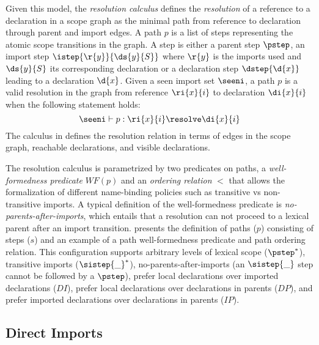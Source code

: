 Given this model, the \emph{resolution calculus} defines the \emph{resolution}
of a reference to a declaration in a scope graph \cite{NeronTVW-ESOP-2015} as
the minimal path from reference to declaration through parent and import edges.
A path $p$ is a list of steps representing the atomic scope transitions in the
graph. A step is either a parent step $\pstep$, an import step
$\istep{\r{y}}{\ds{y}{S}}$ where $\r{y}$ is the imports used and $\ds{y}{S}$ its
corresponding declaration or a declaration step $\dstep{\d{x}}$ leading to a
declaration $\d{x}$.
Given a seen import set $\seeni$, a path $p$ is a valid resolution in the graph
from reference $\ri{x}{i}$ to declaration $\di{x}{i}$ when the following
statement holds:\vspace*{-2mm}
$$\seeni \vdash p : \ri{x}{i} \resolve \di{x}{i}\vspace*{-2mm}$$ 
The calculus in
 defines the resolution relation in terms of edges in the scope
graph, reachable declarations, and visible declarations.

The resolution calculus is parametrized by two predicates on paths, a
\emph{well-formedness predicate} $WF(p)$ and an \emph{ordering relation} $<$
that allows the formalization of different name-binding policies such as
transitive vs non-transitive imports. A typical definition of the
well-formedness predicate is \emph{no-parents-after-imports}, which entails that
a resolution can not proceed to a lexical parent after an import transition.
 presents the definition of paths ($p$) consisting of steps ($s$)
and an example of a path well-formedness predicate and path ordering relation.
This configuration supports arbitrary levels of lexical scope ($\pstep^*$),
transitive imports ($\sistep{\_}^*$), no-parents-after-imports (an $\sistep{\_}$
step cannot be followed by a $\pstep$), prefer local declarations over imported
declarations ($DI$), prefer local declarations over declarations in parents
($DP$), and prefer imported declarations over declarations in parents ($IP$).


\subsection{Direct Imports}


